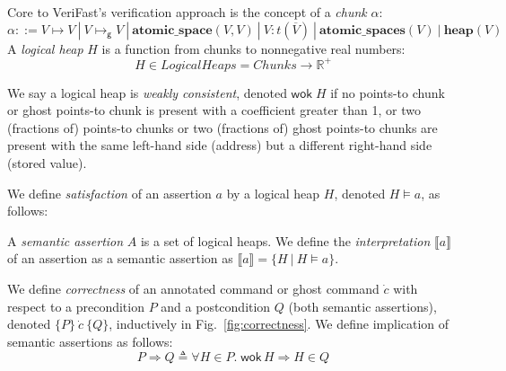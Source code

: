 \documentclass{article}
\begin{document}
Core to VeriFast's verification approach is the concept of a \emph{chunk} $\alpha$:
$$\alpha ::= V \mapsto V\ |\ V \mapsto_\mathsf{g} V\ |\ \mathbf{atomic\_space}(V, V)\ |\ V : t(\overline{V})\ |\ \mathbf{atomic\_spaces}(V)\ |\ \mathbf{heap}(V)$$
A \emph{logical heap} $H$ is a function from chunks to nonnegative real numbers:
$$H \in \mathit{LogicalHeaps} = \mathit{Chunks} \rightarrow \mathbb{R}^+$$

We say a logical heap is \emph{weakly consistent}, denoted $\mathsf{wok}\;H$ if no points-to chunk or ghost points-to chunk is present with a coefficient greater than 1, or two (fractions of) points-to chunks or two (fractions of) ghost points-to chunks are present with the same left-hand side (address) but a different right-hand side (stored value).

We define \emph{satisfaction} of an assertion $a$ by a logical heap $H$, denoted $H \vDash a$, as follows:

A \emph{semantic assertion} $A$ is a set of logical heaps. We define the \emph{interpretation} $\llbracket a\rrbracket$ of an assertion as a semantic assertion as $\llbracket a\rrbracket = \{H\ |\ H\vDash a\}$.

We define \emph{correctness} of an annotated command or ghost command $\dot{c}$ with respect to a precondition $P$ and a postcondition $Q$ (both semantic assertions), denoted $\{P\}\ \dot{c}\ \{Q\}$, inductively in Fig.~\ref{fig:correctness}. We define implication of semantic assertions as follows:
$$P \Rightarrow Q \triangleq \forall H \in P.\;\mathsf{wok}\,H \Rightarrow H \in Q$$
\end{document}
